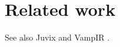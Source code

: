 \section{Related work}\label{related-work}

See also Juvix \autocite{anoma-juvix} and VampIR
\autocite{juvix-to-vampir}.
